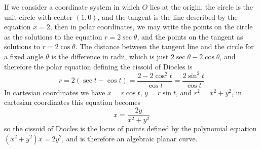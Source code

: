 \begin{example}
\begin{center}
    \end{center}
    If we consider a coordinate system in which $O$ lies at the origin, the circle is the unit circle with center $(1,0)$, and the tangent is the line described by the equation $x = 2$, then in polar coordinates, we may write the points on the circle as the solutions to the equation $r = 2 \sec \theta$, and the points on the tangent as solutions to $r = 2 \cos \theta$. The distance between the tangent line and the circle for a fixed angle $\theta$ is the difference in radii, which is just $2 \sec \theta - 2 \cos \theta$, and therefore the polar equation defining the cissoid of Diocles is
    \[ r = 2(\sec t - \cos t) = \frac{2 - 2\cos^2 t}{\cos t} = \frac{2 \sin^2 t}{\cos t}\]
    In cartesian coordinates we have $x = r \cos t$, $y = r \sin t$, and $r^2 = x^2 + y^2$, in cartesian coordinates this equation becomes
    \[ x = \frac{2y}{x^2 + y^2} \]
    so the cissoid of Diocles is the locus of points defined by the polynomial equation $(x^2 + y^2) x = 2y^2$, and is therefore an algebraic planar curve.
\end{example}

